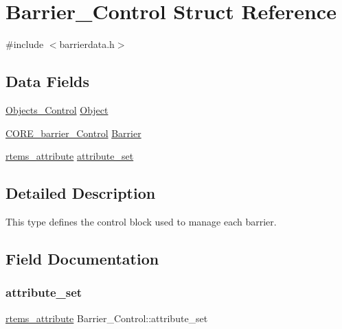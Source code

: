 \hypertarget{structBarrier__Control}{}\section{Barrier\+\_\+\+Control Struct Reference}
\label{structBarrier__Control}


{\ttfamily \#include $<$barrierdata.\+h$>$}

\subsection*{Data Fields}
\begin{DoxyCompactItemize}
\item 
\mbox{\hyperlink{structObjects__Control}{Objects\+\_\+\+Control}} \mbox{\hyperlink{structBarrier__Control_a99d3eb1c4c67348d65da23a0654b3909}{Object}}
\item 
\mbox{\hyperlink{structCORE__barrier__Control}{C\+O\+R\+E\+\_\+barrier\+\_\+\+Control}} \mbox{\hyperlink{structBarrier__Control_a9612e4c821f2ba3d8d9c38ea5eccead4}{Barrier}}
\item 
\mbox{\hyperlink{group__ClassicAttributes_gaea40313cf78ed843e09c4315d0a10f79}{rtems\+\_\+attribute}} \mbox{\hyperlink{structBarrier__Control_a7a1024080b7f22d9223f9ba739a4280c}{attribute\+\_\+set}}
\end{DoxyCompactItemize}


\subsection{Detailed Description}
This type defines the control block used to manage each barrier. 

\subsection{Field Documentation}
\mbox{\label{structBarrier__Control_a7a1024080b7f22d9223f9ba739a4280c}} 
\subsubsection{\texorpdfstring{attribute\_set}{attribute\_set}}
{\footnotesize\ttfamily \mbox{\hyperlink{group__ClassicAttributes_gaea40313cf78ed843e09c4315d0a10f79}{rtems\+\_\+attribute}} Barrier\+\_\+\+Control\+::attribute\+\_\+set}

